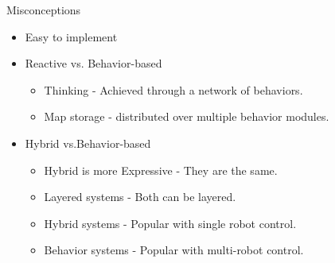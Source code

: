 \documentclass{beamer}
\begin{document}
\begin{frame}{Misconceptions}
  \begin{itemize}
    \item Easy to implement
    \item Reactive vs. Behavior-based
    \begin{itemize}
      \item Thinking - Achieved through a network of behaviors.
      \item Map storage - distributed over multiple behavior modules.
    \end{itemize}
    \item Hybrid vs.Behavior-based
    \begin{itemize}
      \item Hybrid is more Expressive - They are the same.
      \item Layered systems - Both can be layered.
      \item Hybrid systems - Popular with single robot control.
      \item Behavior systems - Popular with multi-robot control.
    \end{itemize}
  \end{itemize}
\end{frame}
\end{document}
